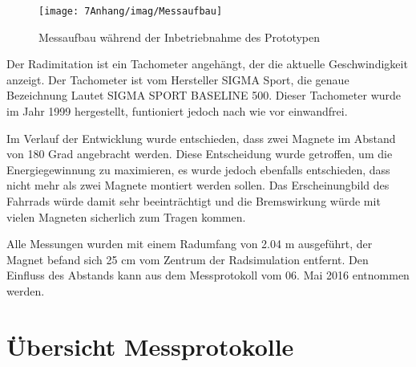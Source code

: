 \begin{figure}[ht]
    \texttt{[image: 7Anhang/imag/Messaufbau]}
	\caption{Messaufbau während der Inbetriebnahme des Prototypen}
	\label{messaufbau_anhang}
\end{figure}

Der Radimitation ist ein Tachometer angehängt, der die aktuelle Geschwindigkeit anzeigt. Der Tachometer ist vom Hersteller SIGMA Sport, die genaue Bezeichnung Lautet SIGMA SPORT BASELINE 500. Dieser Tachometer wurde im Jahr 1999 hergestellt, funtioniert jedoch nach wie vor einwandfrei.

Im Verlauf der Entwicklung wurde entschieden, dass zwei Magnete im Abstand von 180 Grad angebracht werden. Diese Entscheidung wurde getroffen, um die Energiegewinnung zu maximieren, es wurde jedoch ebenfalls entschieden, dass nicht mehr als zwei Magnete montiert werden sollen. Das Erscheinungbild des Fahrrads würde damit sehr beeinträchtigt und die Bremswirkung würde mit vielen Magneten sicherlich zum Tragen kommen.

Alle Messungen wurden mit einem Radumfang von 2.04 m ausgeführt, der Magnet befand sich 25 cm vom Zentrum der Radsimulation entfernt. Den Einfluss des Abstands kann aus dem Messprotokoll vom 06. Mai 2016 entnommen werden.

\chapter{Übersicht Messprotokolle}
\label{uebersicht_messprotokolle}

